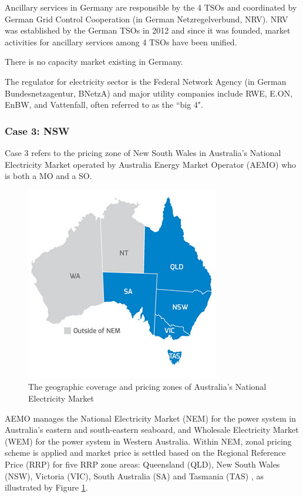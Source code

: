 Ancillary services in Germany are responsible by the 4 TSOs and coordinated by German Grid Control Cooperation (in German Netzregelverbund, NRV). NRV was established by the German TSOs in 2012 and since it was founded, market activities for ancillary services among 4 TSOs have been unified.

There is no capacity market existing in Germany.

The regulator for electricity sector is the Federal Network Agency (in German Bundesnetzagentur, BNetzA) and major utility companies include RWE, E.ON, EnBW, and Vattenfall, often referred to as the ``big 4".

\subsubsection{Case 3: NSW}

Case 3 refers to the pricing zone of New South Wales in Australia's National Electricity Market operated by Australia Energy Market Operator (AEMO) who is both a MO and a SO.

\begin{figure}[h!]
	\centering
	\includegraphics[width=0.7\linewidth]{Figures/AEMO_map.jpg}
	\caption{The geographic coverage and pricing zones of Australia's National Electricity Market \cite{Bayer2015}}
	\label{fig:nsw-map}
\end{figure}

AEMO manages the National Electricity Market (NEM) for the power system in Australia's eastern and south-eastern seaboard, and Wholesale Electricity Market (WEM) for the power system in Western Australia. Within NEM, zonal pricing scheme is applied and market price is settled based on the Regional Reference Price (RRP) for five RRP zone areas: Queensland (QLD), New South Wales (NSW), Victoria (VIC), South Australia (SA) and Tasmania (TAS) \cite{AEMO2010,AEMO_web}, as illustrated by Figure \ref{fig:nsw-map}.


